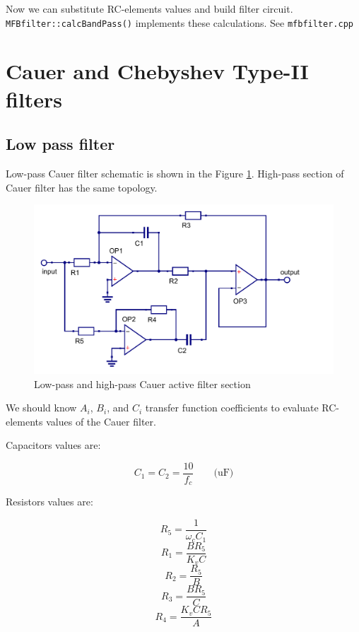 Now we can substitute RC-elements values and build filter circuit. 
\verb|MFBfilter::calcBandPass()| implements these calculations. See 
\verb|mfbfilter.cpp|




\section{Cauer and Chebyshev Type-II filters}

\subsection{Low pass filter}

Low-pass Cauer filter schematic is shown in the Figure \ref{fig:sch_cauer}.
High-pass section of Cauer filter has the same topology.

\begin{figure}[!ht]
  \centering
  \includegraphics[width=0.8\linewidth]{pics/cauer}
  \caption{Low-pass and high-pass Cauer active filter section}
  \label{fig:sch_cauer}
\end{figure}

We should know $A_i$, $B_i$, and $C_i$ transfer function coefficients to
evaluate RC-elements values of the Cauer filter.

Capacitors values are:

\begin{equation}
 C_1=C_2=\frac{10}{f_c} \qquad \mbox{(uF)}  \label{eq:cauer_C1_C2}
\end{equation}

Resistors values are:

\begin{equation}
 R_5=\frac{1}{\omega_c C_1} \label{eq:cauer_R5}
\end{equation}
\begin{equation}
 R_1=\frac{BR_5}{K_v C}
\end{equation}
\begin{equation}
 R_2=\frac{R_5}{B}
\end{equation}
\begin{equation}
 R_3=\frac{BR_5}{C}
\end{equation}
\begin{equation}
 R_4=\frac{K_v C R_5}{A}
\end{equation}

